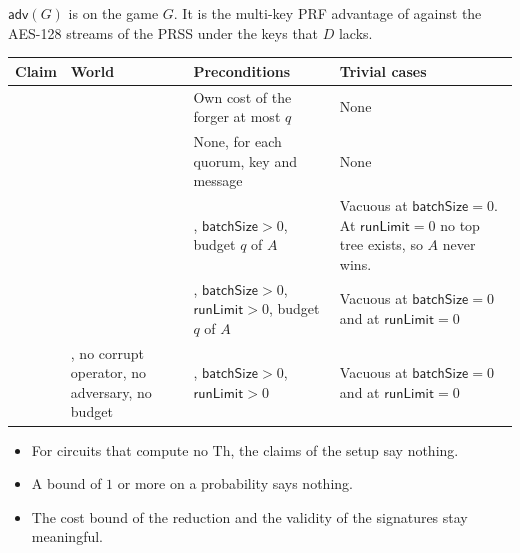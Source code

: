 \documentclass[11pt]{article}
\newcommand{\Th}{\mathrm{Th}}
\newcommand{\rowrule}{\specialrule{0.2pt}{2.5pt}{2.5pt}}
\begin{document}
$\mathsf{adv}(G)$ is  on the game $G$. It is the multi-key PRF advantage of
 against the AES-128 streams of the PRSS under the keys that $D$ lacks.
{\small
\begin{xltabular}{\textwidth}{@{}lL{2.6cm}XL{4.4cm}@{}}
\toprule
Claim & World & Preconditions & Trivial cases \\
\midrule
\endhead
{} &  & Own cost of the forger at most $q$ & None \\
\rowrule
{} &  & None, for each quorum, key and message & None \\
\rowrule
{} &  & , $\mathsf{batchSize}>0$, budget $q$ of
$A$ & Vacuous at $\mathsf{batchSize}=0$. At $\mathsf{runLimit}=0$ no top tree exists, so $A$ never
wins. \\
\rowrule
{} &  & , $\mathsf{batchSize}>0$,
$\mathsf{runLimit}>0$, budget $q$ of $A$ & Vacuous at $\mathsf{batchSize}=0$ and at
$\mathsf{runLimit}=0$ \\
\rowrule
{} & , no corrupt operator, no adversary, no budget &
, $\mathsf{batchSize}>0$, $\mathsf{runLimit}>0$ & Vacuous at
$\mathsf{batchSize}=0$ and at $\mathsf{runLimit}=0$ \\
\bottomrule
\end{xltabular}}
\begin{itemize}
\item For circuits that compute no $\Th$, the claims of the setup say nothing.
\item A bound of $1$ or more on a probability says nothing.
\item The cost bound of the reduction and the validity of the signatures stay meaningful.
\end{itemize}
\end{document}
